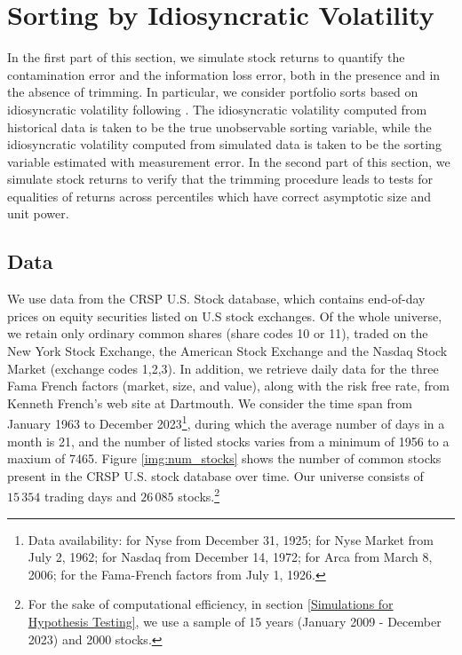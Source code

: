 
\section{Sorting by Idiosyncratic Volatility}
\label{Sorting by Idiosyncratic Volatility}

In the first part of this section, we simulate stock returns to quantify the contamination error and the information loss error, both in the presence and in the absence of trimming. In particular, we consider portfolio sorts based on idiosyncratic volatility following \cite{ang2006cross}. The idiosyncratic volatility computed from historical data is taken to be the true unobservable sorting variable, while the idiosyncratic volatility computed from simulated data is taken to be the sorting variable estimated with measurement error. In the second part of this section, we simulate stock returns to verify that the trimming procedure leads to tests for equalities of returns across percentiles which have correct asymptotic size and unit power. %

\subsection{Data}

We use data from the CRSP U.S. Stock database, which contains end-of-day prices on equity securities listed on U.S stock exchanges. Of the whole universe, we retain only ordinary common shares (share codes 10 or 11), traded on the New York Stock Exchange, the American Stock Exchange and the Nasdaq Stock Market (exchange codes 1,2,3). In addition, we retrieve daily data for the three Fama French factors (market, size, and value), along with the risk free rate, from Kenneth French's web site at Dartmouth. We consider the time span from January 1963 to December 2023\footnote{Data availability: for Nyse from December 31, 1925; for Nyse Market from July 2, 1962; for Nasdaq from December 14, 1972; for Arca from March 8, 2006; for the Fama-French factors from July 1, 1926.}, during which the average number of days in a month is 21, and the number of listed stocks varies from a minimum of 1956 to a maxium of 7465. Figure \ref{img:num_stocks} shows the number of common stocks present in the CRSP U.S. stock database over time. Our universe consists of $15\, 354$ trading days and $26\, 085$ stocks.\footnote{For the sake of computational efficiency, in section \ref{Simulations for Hypothesis Testing}, we use a sample of 15 years (January 2009 - December 2023) and 2000 stocks.} 

